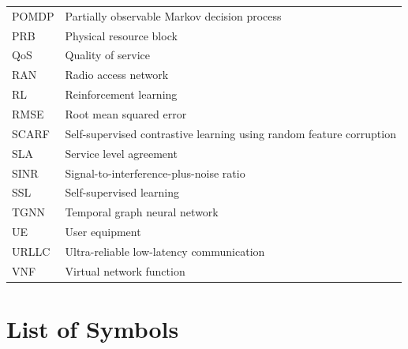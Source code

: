 \begin{longtable}{p{3.2cm} p{11cm}}
POMDP & Partially observable Markov decision process \\
PRB & Physical resource block \\
QoS & Quality of service \\
RAN & Radio access network \\
RL & Reinforcement learning \\
RMSE & Root mean squared error \\
SCARF & Self-supervised contrastive learning using random feature corruption \\
SLA & Service level agreement \\
SINR & Signal-to-interference-plus-noise ratio \\
SSL & Self-supervised learning \\
TGNN & Temporal graph neural network \\
UE & User equipment \\
URLLC & Ultra-reliable low-latency communication \\
VNF & Virtual network function \\
\end{longtable}

\newpage

\section*{{\huge List of Symbols}\hfill}
\vspace{0.5cm}

